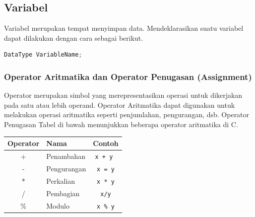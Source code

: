 \subsection{Variabel}
Variabel merupakan tempat menyimpan data. Mendeklarasikan suatu variabel dapat dilakukan dengan cara sebagai berikut.
\begin{lstlisting}[language=c,caption=Deklarasi Variabel C,label=lst:deklarasivariabel,captionpos=t]
DataType VariableName;
\end{lstlisting}
\subsubsection{Operator Aritmatika dan Operator Penugasan (Assignment)}
Operator merupakan simbol yang merepresentasikan operasi untuk dikerjakan pada satu atau lebih operand. Operator Aritmatika dapat digunakan untuk melakukan operasi aritmatika seperti penjumlahan, pengurangan, dsb. Operator Penugasan 
Tabel di bawah menunjukkan beberapa operator aritmatika di C.
\begin{center}
	\begin{tabular}{|c|l|c|}
		\hline
		\multicolumn{1}{|l|}{\textbf{Operator}} & \textbf{Nama} & \multicolumn{1}{l|}{\textbf{Contoh}} \\ \hline
		+                                       & Penambahan    & \verb|x + y |                        \\ \hline
		-                                       & Pengurangan   & \verb|x = y|                         \\ \hline
		*                                       & Perkalian     & \verb|x * y|                         \\ \hline
		/                                       & Pembagian     & \verb|x/y|                           \\ \hline
		\%                                      & Modulo        & \verb|x % y|                         \\ \hline
	\end{tabular}
\end{center}

